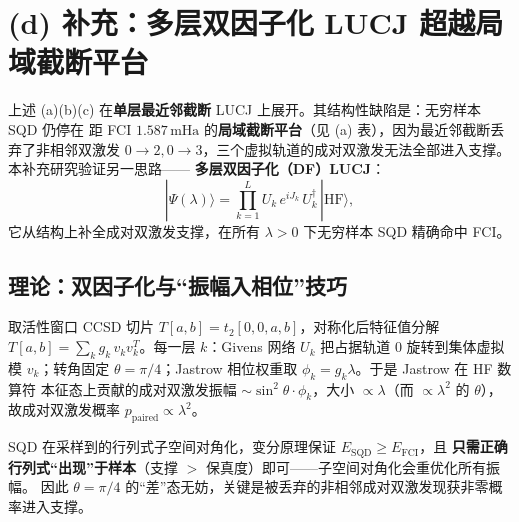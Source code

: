 \documentclass[11pt,a4paper]{article}
\newcommand{\HF}{\text{HF}}
\newcommand{\mHa}{\,\text{mHa}}
\begin{document}
\section{(d) 补充：多层双因子化 LUCJ 超越局域截断平台}
上述 (a)(b)(c) 在\textbf{单层最近邻截断} LUCJ 上展开。其结构性缺陷是：无穷样本 SQD 仍停在
距 FCI $1.587\mHa$ 的\textbf{局域截断平台}（见 (a) 表），因为最近邻截断丢弃了非相邻双激发
$0\!\to\!2,0\!\to\!3$，三个虚拟轨道的成对双激发无法全部进入支撑。本补充研究验证另一思路——
\textbf{多层双因子化（DF）LUCJ}：
\[
  |\Psi(\lambda)\rangle = \prod_{k=1}^{L} U_k\, e^{iJ_k}\, U_k^\dagger\,|\HF\rangle,
\]
它从结构上补全成对双激发支撑，在所有 $\lambda>0$ 下无穷样本 SQD 精确命中 FCI。

\subsection*{理论：双因子化与“振幅入相位”技巧}
取活性窗口 CCSD 切片 $T[a,b]=t_2[0,0,a,b]$，对称化后特征值分解
$T[a,b]=\sum_k g_k\, v_k v_k^{T}$。每一层 $k$：Givens 网络 $U_k$ 把占据轨道 $0$ 旋转到集体虚拟模
$v_k$；转角固定 $\theta=\pi/4$；Jastrow 相位权重取 $\phi_k=g_k\lambda$。于是 Jastrow 在 HF 数算符
本征态上贡献的成对双激发振幅 $\sim\sin^2\theta\cdot\phi_k$，大小 $\propto\lambda$（而
$\propto\lambda^2$ 的 $\theta$），故成对双激发概率 $p_{\text{paired}}\propto\lambda^2$。

SQD 在采样到的行列式子空间对角化，变分原理保证 $E_{\text{SQD}}\ge E_{\text{FCI}}$，且
\textbf{只需正确行列式“出现”于样本}（支撑 $>$ 保真度）即可——子空间对角化会重优化所有振幅。
因此 $\theta=\pi/4$ 的“差”态无妨，关键是被丢弃的非相邻成对双激发现获非零概率进入支撑。
\end{document}
